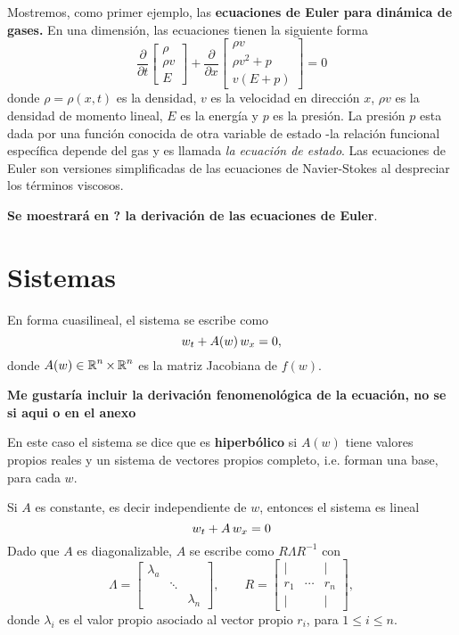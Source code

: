 Mostremos, como primer ejemplo, las \textbf{ecuaciones de Euler para dinámica de gases.} En una dimensión, las ecuaciones tienen la siguiente forma
\[
\frac{\partial}{\partial t} 
\begin{bmatrix}
\rho \\
\rho v \\
E
\end{bmatrix}
+
\frac{\partial}{\partial x} 
\begin{bmatrix}
\rho v \\
\rho v^2 + p \\
v (E + p)
\end{bmatrix} = 0
\]
donde $\rho = \rho(x,t)$ es la densidad, $v$ es la velocidad en dirección $x$, $\rho v$ es la densidad de momento lineal, $E$ es la energía y $p$ es la presión. La presión $p$ esta dada por una función conocida de otra variable de estado -la relación funcional específica depende del gas y es llamada \textit{la ecuación de estado}. Las ecuaciones de Euler son versiones simplificadas de las ecuaciones de Navier-Stokes al despreciar los términos viscosos.

\textbf{Se moestrará en ? la derivación de las ecuaciones de Euler}.
























\section{Sistemas}



En forma cuasilineal, el sistema se escribe como
\[
w_t + A(w) \thinspace w_x = 0,
\]
donde $A(w) \in \operatorname{\mathbb R}^n\times \operatorname{\mathbb R}^n$ es la matriz Jacobiana de $f(w)$.

\textbf{Me gustaría incluir la derivación fenomenológica de la ecuación, no se si aqui o en el anexo}

En este caso el sistema se dice que es \textbf{hiperbólico} si $A(w)$ tiene valores propios reales y un sistema de vectores propios completo, i.e. forman una base, para cada $w$.

Si $A$ es constante, es decir independiente de $w$, entonces el sistema es lineal
\[
w_t + A \thinspace w_x = 0
\]
Dado que $A$ es diagonalizable, $A$ se escribe como $R \Lambda R^{-1}$ con
\[
\Lambda = \begin{bmatrix} \lambda_a & & \\ & \ddots & \\ & & \lambda_n \end{bmatrix},
\qquad 
R = \begin{bmatrix}
    | &  & |\\
    r_1 & \cdots & r_n\\
    | &  & |
  \end{bmatrix},
\]
donde $\lambda_i$ es el valor propio asociado al vector propio $r_i$, para $1 \leq i \leq n$. 

